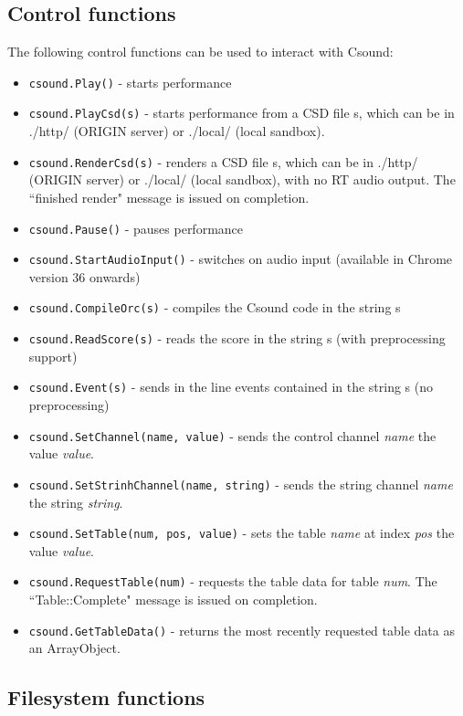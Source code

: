 \documentclass[11pt]{article}
\begin{document}
\subsection{Control functions}

The following control functions can be used to interact with Csound:

\begin{itemize}
\item {\tt csound.Play()} - starts performance
\item {\tt csound.PlayCsd(s)} - starts performance from a CSD file s, which can be in ./http/ (ORIGIN server) or ./local/ (local sandbox).
\item {\tt csound.RenderCsd(s)} - renders a CSD file s, which can be in ./http/ (ORIGIN server) or ./local/ (local sandbox), with no RT audio output.
The ``finished render" message is issued on completion.
\item {\tt csound.Pause()} - pauses performance
\item  {\tt csound.StartAudioInput()} - switches on audio input
  (available in Chrome version 36 onwards)
\item {\tt csound.CompileOrc(s)} - compiles the Csound code in the string s
\item {\tt csound.ReadScore(s)} - reads the score in the string s (with preprocessing support)
\item {\tt csound.Event(s)} - sends in the line events contained in the string s (no preprocessing)
\item {\tt csound.SetChannel(name, value)} - sends the control channel
  \emph{name} the value \emph{value}.
\item {\tt csound.SetStrinhChannel(name, string)} - sends the string channel
  \emph{name} the string \emph{string}.
\item {\tt csound.SetTable(num, pos, value)} - sets the table
  \emph{name} at index \emph{pos} the value \emph{value}.
\item {\tt csound.RequestTable(num)} - requests the table data for
  table \emph{num}. The ``Table::Complete" message is issued on completion. 
\item {\tt csound.GetTableData()} - returns the most recently
  requested table data as an ArrayObject. 
\end{itemize}

\subsection{Filesystem functions}
\end{document}
